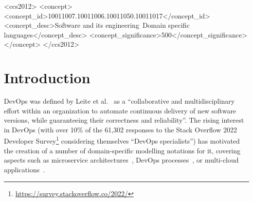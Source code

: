 \documentclass[sigconf,review]{acmart}
\begin{document}
\begin{CCSXML}
  <ccs2012>
  <concept>
  <concept_id>10011007.10011006.10011050.10011017</concept_id>
  <concept_desc>Software and its engineering~Domain specific languages</concept_desc>
  <concept_significance>500</concept_significance>
  </concept>
  </ccs2012>
\end{CCSXML}




\maketitle

\section{Introduction}

DevOps was defined by Leite et al.~\cite{leite_survey_2020} as a ``collaborative
and multidisciplinary effort within an organization to automate continuous
delivery of new software versions, while guaranteeing their correctness and
reliability''. The rising interest in DevOps (with over 10\% of the 61,302
responses to the Stack Overflow 2022 Developer
Survey\footnote{\url{https://survey.stackoverflow.co/2022/}} considering
themselves ``DevOps specialists'') has motivated the creation of a number of
domain-specific modelling notations for it, covering aspects such as
microservice architectures~\cite{sorgalla_applying_2021}, DevOps
processes~\cite{colantoni_devopsml_2020}, or multi-cloud
applications~\cite{ferry_cloudmf_2018}.
\end{document}
